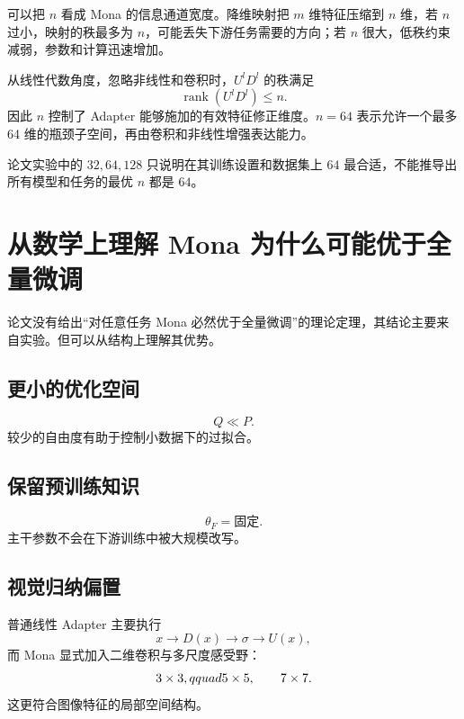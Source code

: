\documentclass[UTF8,12pt,a4paper,fontset=none]{ctexart}
\begin{document}
可以把 $n$ 看成 Mona 的信息通道宽度。降维映射把 $m$ 维特征压缩到 $n$ 维，若 $n$ 过小，映射的秩最多为 $n$，可能丢失下游任务需要的方向；若 $n$ 很大，低秩约束减弱，参数和计算迅速增加。

从线性代数角度，忽略非线性和卷积时，$U^lD^l$ 的秩满足
\begin{equation}
 \operatorname{rank}(U^lD^l)\leq n.
\end{equation}
因此 $n$ 控制了 Adapter 能够施加的有效特征修正维度。$n=64$ 表示允许一个最多 64 维的瓶颈子空间，再由卷积和非线性增强表达能力。

论文实验中的 $32,64,128$ 只说明在其训练设置和数据集上 $64$ 最合适，不能推导出所有模型和任务的最优 $n$ 都是 $64$。

\section{从数学上理解 Mona 为什么可能优于全量微调}

论文没有给出“对任意任务 Mona 必然优于全量微调”的理论定理，其结论主要来自实验。但可以从结构上理解其优势。

\subsection{更小的优化空间}
\begin{equation}
 Q\ll P.
\end{equation}
较少的自由度有助于控制小数据下的过拟合。

\subsection{保留预训练知识}
\begin{equation}
 \theta_F=\text{固定}.
\end{equation}
主干参数不会在下游训练中被大规模改写。

\subsection{视觉归纳偏置}
普通线性 Adapter 主要执行
\begin{equation}
 x\to D(x)\to\sigma\to U(x),
\end{equation}
而 Mona 显式加入二维卷积与多尺度感受野：
\begin{equation}
 3\times3,\\qquad5\times5,
 \qquad7\times7.
\end{equation}
这更符合图像特征的局部空间结构。
\end{document}
